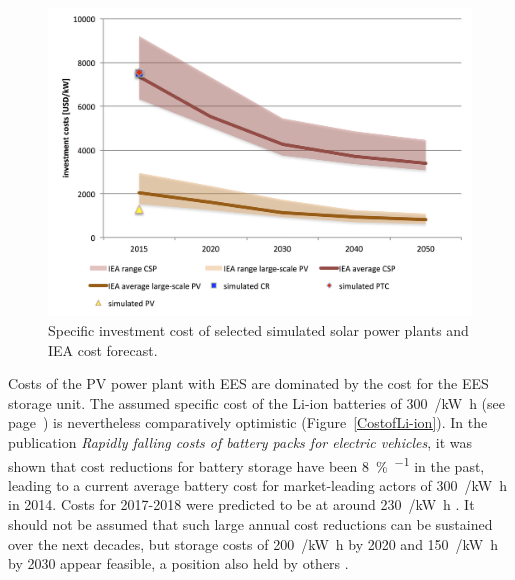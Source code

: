 \begin{figure}[htbp]  
\centering
\includegraphics[width=1\linewidth]{FIG/investmentcost}
\caption{Specific investment cost of selected simulated solar power plants and IEA cost forecast.}\label{investmentcost}
\end{figure}

Costs of the PV power plant with EES are dominated by the cost for the EES storage unit. The assumed specific cost of the Li-ion batteries of \SI{300}{\usd/\kilo\watt\hour} (see page~\pageref{SUBSUBPVFinancialparameter}) is nevertheless comparatively optimistic (Figure~\ref{CostofLi-ion}). In the publication \emph{Rapidly falling costs of battery packs for electric vehicles}, it was shown that cost reductions for battery storage have been \SI{8}{\percent\per\year} in the past, leading to a current average battery cost for market-leading actors of \SI{300}{\usd/\kilo\watt\hour} in 2014. Costs for 2017-2018 were predicted to be at around \SI{230}{\usd/\kilo\watt\hour} \cite{Nykvist2015}. It should not be assumed that such large annual cost reductions can be sustained over the next decades, but storage costs of \SI{200}{\usd/\kilo\watt\hour} by 2020 and \SI{150}{\usd/\kilo\watt\hour} by 2030 appear feasible, a position also held by others \cite{MckinseyQuaterly2012}.

